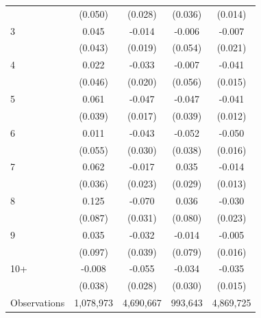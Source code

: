 \begin{table}[htbp]
\begin{tabular}{l*{4}{c}}
            &     (0.050)         &     (0.028)         &     (0.036)         &     (0.014)         \\
[1em]
3           &       0.045         &      -0.014         &      -0.006         &      -0.007         \\
            &     (0.043)         &     (0.019)         &     (0.054)         &     (0.021)         \\
[1em]
4           &       0.022         &      -0.033         &      -0.007         &      -0.041\sym{***}\\
            &     (0.046)         &     (0.020)         &     (0.056)         &     (0.015)         \\
[1em]
5           &       0.061         &      -0.047\sym{***}&      -0.047         &      -0.041\sym{***}\\
            &     (0.039)         &     (0.017)         &     (0.039)         &     (0.012)         \\
[1em]
6           &       0.011         &      -0.043         &      -0.052         &      -0.050\sym{***}\\
            &     (0.055)         &     (0.030)         &     (0.038)         &     (0.016)         \\
[1em]
7           &       0.062\sym{*}  &      -0.017         &       0.035         &      -0.014         \\
            &     (0.036)         &     (0.023)         &     (0.029)         &     (0.013)         \\
[1em]
8           &       0.125         &      -0.070\sym{**} &       0.036         &      -0.030         \\
            &     (0.087)         &     (0.031)         &     (0.080)         &     (0.023)         \\
[1em]
9           &       0.035         &      -0.032         &      -0.014         &      -0.005         \\
            &     (0.097)         &     (0.039)         &     (0.079)         &     (0.016)         \\
[1em]
10+         &      -0.008         &      -0.055\sym{*}  &      -0.034         &      -0.035\sym{**} \\
            &     (0.038)         &     (0.028)         &     (0.030)         &     (0.015)         \\
\hline
Observations&   1,078,973         &   4,690,667         &     993,643         &   4,869,725         \\

\end{tabular}
\end{table}
